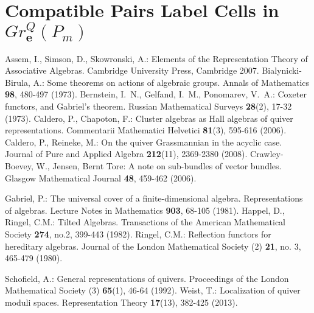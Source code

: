 \documentclass{amsart}
\newcommand{\bfe}{\mathbf{e}}
\begin{document}
\section{Compatible Pairs Label Cells in $Gr^Q_\bfe(P_m)$}
\begin{thebibliography}{10}
Assem, I., Simson, D., Skowronski, A.: Elements of the Representation Theory of Associative Algebras. Cambridge University Press, Cambridge 2007.
 Bialynicki-Birula, A.: Some theorems on actions of algebraic groups. Annals of Mathematics \textbf{98}, 480-497 (1973).
Bernstein, I.~N., Gelfand, I.~M., Ponomarev, V.~A.: Coxeter functors, and Gabriel's theorem. Russian Mathematical Surveys \textbf{28}(2), 17-32 (1973).
Caldero, P., Chapoton, F.: Cluster algebras as {H}all algebras of quiver representations.
Commentarii Mathematici Helvetici \textbf{81}(3), 595-616 (2006).
Caldero, P., Reineke, M.: On the quiver Grassmannian in the acyclic case.
Journal of Pure and Applied Algebra \textbf{212}(11), 2369-2380 (2008).
 Crawley-Boevey, W., Jensen, Bernt Tore: A note on sub-bundles of vector bundles. Glasgow Mathematical Journal \textbf{48}, 459-462 (2006).

 Gabriel, P.: The universal cover of a finite-dimensional algebra. Representations of algebras. Lecture Notes in Mathematics {\bf 903}, 68-105 (1981).
 Happel, D., Ringel, C.M.: Tilted Algebras. Transactions of the American Mathematical Society {\bf 274}, no.2, 399-443 (1982).
 Ringel, C.M.: Reflection functors for hereditary algebras. Journal of the London Mathematical Society (2) {\bf 21}, no. 3, 465-479 (1980).

 Schofield, A.: General representations of quivers. Proceedings of the London Mathematical Society (3) \textbf{65}(1), 46-64 (1992).
	 Weist, T.: Localization of quiver moduli spaces. Representation Theory \textbf{17}(13), 382-425 (2013).
\end{thebibliography}
\end{document}
